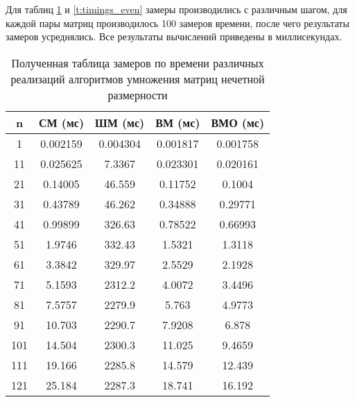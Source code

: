 Для таблиц \ref{t:timings} и \ref{t:timings_even} замеры  производились с различным шагом, для каждой пары матриц производилось 100 замеров времени, после чего результаты замеров усреднялись. Все результаты вычислений приведены в миллисекундах.

\begin{table}[!ht]
	\centering
	\caption{Полученная таблица замеров по времени различных реализаций алгоритмов умножения матриц нечетной размерности}
	\begin{tabular}{|c|c|c|c|c|}
		\hline
		n   & СМ (мс)  & ШМ (мс)  & \multicolumn{1}{c|}{ВМ (мс)} & ВМО (мс) \\ \hline
		1   & 0.002159 & 0.004304 & 0.001817                     & 0.001758 \\ \hline
		11  & 0.025625 & 7.3367   & 0.023301                     & 0.020161 \\ \hline
		21  & 0.14005  & 46.559   & 0.11752                      & 0.1004   \\ \hline
		31  & 0.43789  & 46.262   & 0.34888                      & 0.29771  \\ \hline
		41  & 0.99899  & 326.63   & 0.78522                      & 0.66993  \\ \hline
		51  & 1.9746   & 332.43   & 1.5321                       & 1.3118   \\ \hline
		61  & 3.3842   & 329.97   & 2.5529                       & 2.1928   \\ \hline
		71  & 5.1593   & 2312.2   & 4.0072                       & 3.4496   \\ \hline
		81  & 7.5757   & 2279.9   & 5.763                        & 4.9773   \\ \hline
		91  & 10.703   & 2290.7   & 7.9208                       & 6.878    \\ \hline
		101 & 14.504   & 2300.3   & 11.025                       & 9.4659   \\ \hline
		111 & 19.166   & 2285.8   & 14.579                       & 12.439   \\ \hline
		121 & 25.184   & 2287.3   & 18.741                       & 16.192   \\ \hline
	\end{tabular}
	\label{t:timings}
\end{table}


